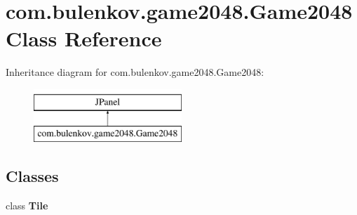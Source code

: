\hypertarget{classcom_1_1bulenkov_1_1game2048_1_1_game2048}{}\section{com.\+bulenkov.\+game2048.\+Game2048 Class Reference}
\label{classcom_1_1bulenkov_1_1game2048_1_1_game2048}
Inheritance diagram for com.\+bulenkov.\+game2048.\+Game2048\+:\begin{figure}[H]
\begin{center}
\leavevmode
\includegraphics[height=2.000000cm]{classcom_1_1bulenkov_1_1game2048_1_1_game2048}
\end{center}
\end{figure}
\subsection*{Classes}
\begin{DoxyCompactItemize}
\item 
class {\bfseries Tile}
\end{DoxyCompactItemize}
